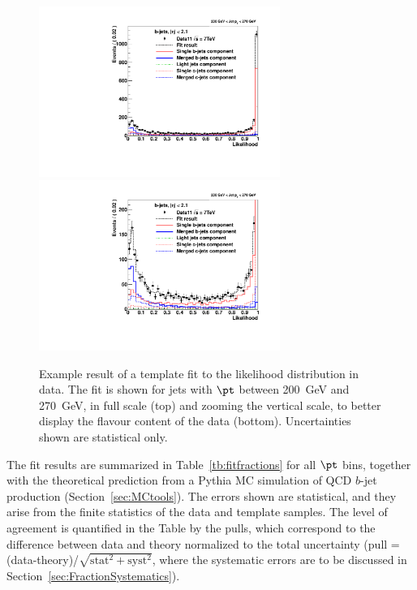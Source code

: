 \begin{figure}[tp]
\centering
\includegraphics[width=0.7\textwidth]{FIGS/Fits/LikelihoodFit_3param_ETAFull_Bin5.pdf}
\includegraphics[width=0.7\textwidth]{FIGS/Fits/LikelihoodFit_3param_ETAFull_ZOOM_Bin5.pdf}
\caption{Example result of a template fit to the likelihood distribution in data. The fit is shown for jets with $\pt$ between  200~GeV and 270~GeV, in full scale (top) and zooming the vertical scale, to better display the flavour content of the data (bottom). Uncertainties shown are statistical only.}
\label{fig:fittemplates2}
\end{figure}

The fit results are summarized in Table~\ref{tb:fitfractions} for all $\pt$ bins, together with the theoretical prediction from a {\sc Pythia} MC simulation of QCD $b$-jet production (Section~\ref{sec:MCtools}). The errors shown are statistical, and they arise from the finite statistics of the data and template samples. The level of agreement is quantified in the Table by the pulls, which correspond to the difference between data and theory normalized to the total uncertainty (pull = (data-theory)/$\sqrt{\text{stat}^2+\text{syst}^2}$, where the systematic errors are to be discussed in Section~\ref{sec:FractionSystematics}). 

